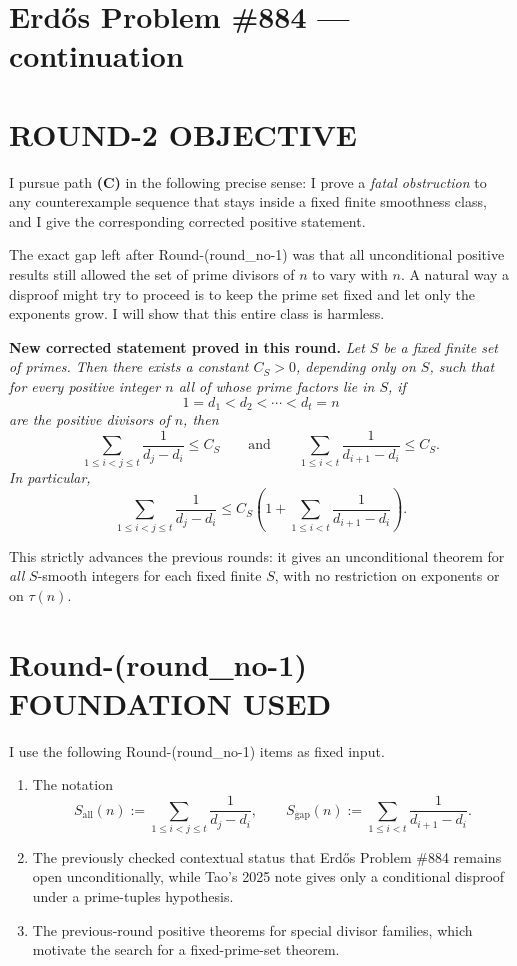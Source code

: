 \section{Erd\H{o}s Problem \#884 --- continuation}

\section{ROUND-2 OBJECTIVE}

I pursue path \textbf{(C)} in the following precise sense: I prove a \emph{fatal obstruction} to any counterexample sequence that stays inside a fixed finite smoothness class, and I give the corresponding corrected positive statement.

The exact gap left after Round-(round\_no-1) was that all unconditional positive results still allowed the set of prime divisors of \(n\) to vary with \(n\). A natural way a disproof might try to proceed is to keep the prime set fixed and let only the exponents grow. I will show that this entire class is harmless.

\medskip

\noindent\textbf{New corrected statement proved in this round.}
\emph{Let \(S\) be a fixed finite set of primes. Then there exists a constant \(C_S>0\), depending only on \(S\), such that for every positive integer \(n\) all of whose prime factors lie in \(S\), if}
\[
1=d_1<d_2<\cdots<d_t=n
\]
\emph{are the positive divisors of \(n\), then}
\[
\sum_{1\le i<j\le t}\frac{1}{d_j-d_i}\le C_S
\qquad\text{and}\qquad
\sum_{1\le i<t}\frac{1}{d_{i+1}-d_i}\le C_S.
\]
\emph{In particular,}
\[
\sum_{1\le i<j\le t}\frac{1}{d_j-d_i}\le C_S\left(1+\sum_{1\le i<t}\frac{1}{d_{i+1}-d_i}\right).
\]

This strictly advances the previous rounds: it gives an unconditional theorem for \emph{all} \(S\)-smooth integers for each fixed finite \(S\), with no restriction on exponents or on \(\tau(n)\).

\section{Round-(round\_no-1) FOUNDATION USED}

I use the following Round-(round\_no-1) items as fixed input.

\begin{enumerate}
\item The notation
\[
S_{\mathrm{all}}(n):=\sum_{1\le i<j\le t}\frac{1}{d_j-d_i},
\qquad
S_{\mathrm{gap}}(n):=\sum_{1\le i<t}\frac{1}{d_{i+1}-d_i}.
\]
\item The previously checked contextual status that Erd\H{o}s Problem \#884 remains open unconditionally, while Tao's 2025 note gives only a conditional disproof under a prime-tuples hypothesis.
\item The previous-round positive theorems for special divisor families, which motivate the search for a fixed-prime-set theorem.
\end{enumerate}

